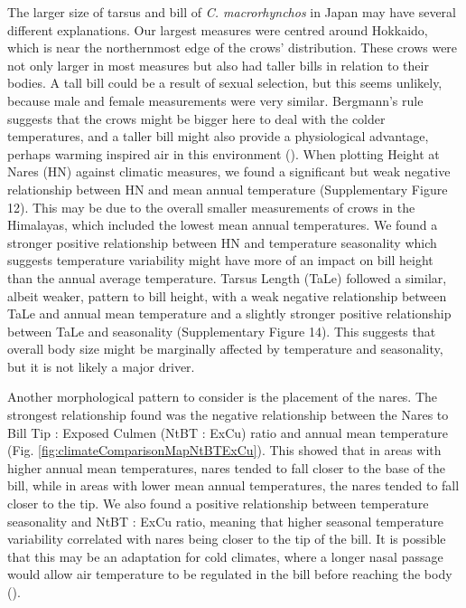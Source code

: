 \documentclass[10pt,a4paper]{article}
\begin{document}
The larger size of tarsus and bill of \emph{C. macrorhynchos} in Japan may have several different explanations.
Our largest measures were centred around Hokkaido, which is near the northernmost edge of the crows' distribution.
These crows were not only larger in most measures but also had taller bills in relation to their bodies.
A tall bill could be a result of sexual selection, but this seems unlikely, because male and female measurements were very similar.
Bergmann's rule suggests that the crows might be bigger here to deal with the colder temperatures, and a taller bill might also provide a physiological advantage, perhaps warming inspired air in this environment ().
When plotting Height at Nares (HN) against climatic measures, we found a significant but weak negative relationship between HN and mean annual temperature (Supplementary Figure 12).
This may be due to the overall smaller measurements of crows in the Himalayas, which included the lowest mean annual temperatures.
We found a stronger positive relationship between HN and temperature seasonality which suggests temperature variability might have more of an impact on bill height than the annual average temperature.
Tarsus Length (TaLe) followed a similar, albeit weaker, pattern to bill height, with a weak negative relationship between TaLe and annual mean temperature and a slightly stronger positive relationship between TaLe and seasonality (Supplementary Figure 14).
This suggests that overall body size might be marginally affected by temperature and seasonality, but it is not likely a major driver.

Another morphological pattern to consider is the placement of the nares.
The strongest relationship found was the negative relationship between the Nares to Bill Tip : Exposed Culmen (NtBT : ExCu) ratio and annual mean temperature (Fig. \ref{fig:climateComparisonMapNtBTExCu}).
This showed that in areas with higher annual mean temperatures, nares tended to fall closer to the base of the bill, while in areas with lower mean annual temperatures, the nares tended to fall closer to the tip.
We also found a positive relationship between temperature seasonality and NtBT : ExCu ratio, meaning that higher seasonal temperature variability correlated with nares being closer to the tip of the bill.
It is possible that this may be an adaptation for cold climates, where a longer nasal passage would allow air temperature to be regulated in the bill before reaching the body ().
\end{document}
